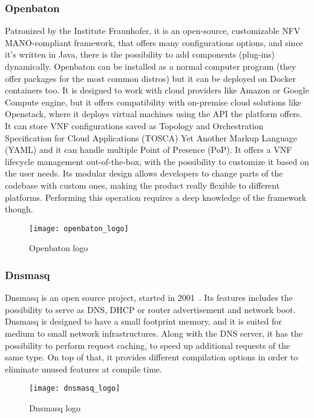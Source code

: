 \subsubsection{Openbaton}
\label{chap:prjan:sec:tech:sub:other:sub:openbaton}
Patronized by the Institute Fraunhofer, it is an open-source, customizable NFV
MANO-compliant framework, that offers many configurations options, and since
it's written in Java, there is the possibility to add components (plug-ins)
dynamically. Openbaton can be installed as a normal computer program (they offer
packages for the most common distros) but it can be deployed on Docker
containers too. It is designed to work with cloud providers like Amazon or
Google Compute engine, but it offers compatibility with on-premise cloud
solutions like Openstack, where it deploys virtual machines using the API the
platform offers. It can store VNF configurations saved as Topology and
Orchestration Specification for Cloud Applications (TOSCA) Yet Another Markup
Language (YAML) and it can handle multiple Point of Presence (PoP). It offers a
VNF lifecycle management out-of-the-box, with the possibility to customize it
based on the user needs. Its modular design allows developers to change parts of
the codebase with custom ones, making the product really flexible to different
platforms. Performing this operation requires a deep knowledge of the framework
though.

\begin{figure}[h]
 \centering \texttt{[image: openbaton\_logo]}
 \caption{Openbaton logo}
 \label{chap:prjan:img:openbaton_logo}
\end{figure}

\subsubsection{Dnsmasq}
\label{chap:prjan:sec:tech:sub:other:sub:dnsmasq}
Dnsmasq is an open source project, started in 2001~\cite{dnsmasqweb}. Its
features includes the possibility to serve as DNS, DHCP or router advertisement
and network boot. Dnsmasq is designed to have a small footprint memory, and it
is suited for medium to small network infrastructures. Along with the DNS
server, it has the possibility to perform request caching, to speed up
additional requests of the same type. On top of that, it provides different
compilation options in order to eliminate unused features at compile time.

\begin{figure}[h]
  \centering
  \texttt{[image: dnsmasq\_logo]}
  \caption{Dnsmasq logo}
\end{figure}
